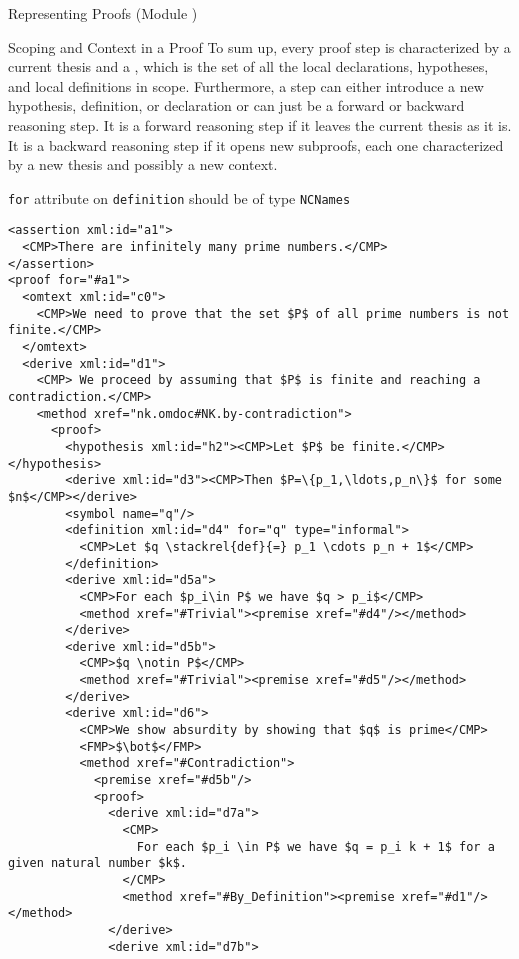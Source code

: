 \begin{tchapter}[id=proofs,short=Representing Proofs]{Representing Proofs (Module {})}
\begin{tsection}[id=proofs:scoping]{Scoping and Context in a Proof}
  To sum up, every proof step is characterized by a current thesis and a
  {}, which is the set of all the local declarations, hypotheses,
  and local definitions in scope. Furthermore, a step can either introduce a new
  hypothesis, definition, or declaration or can just be a forward or backward
  reasoning step.  It is a forward reasoning {} step if it leaves the current
  thesis as it is.  It is a backward reasoning {} step if it opens new
  subproofs, each one characterized by a new thesis and possibly a new context.

\begin{erratum}[reported-by=Michael Kohlhase,date=2009-08-11]{{\texttt{for}} attribute on
    {\texttt{definition}} should be of type {\texttt{NCNames}}}
\begin{lstlisting}[label=lst:primes-omdoc,mathescape,
  caption={A top-down Representation of the Proof in {\myfigref{pf-example1-math}}.},
  index={symbol,definition}]
<assertion xml:id="a1">
  <CMP>There are infinitely many prime numbers.</CMP>
</assertion>
<proof for="#a1">
  <omtext xml:id="c0">
    <CMP>We need to prove that the set $P$ of all prime numbers is not finite.</CMP>
  </omtext>
  <derive xml:id="d1">
    <CMP> We proceed by assuming that $P$ is finite and reaching a contradiction.</CMP>
    <method xref="nk.omdoc#NK.by-contradiction">
      <proof>
        <hypothesis xml:id="h2"><CMP>Let $P$ be finite.</CMP></hypothesis>
        <derive xml:id="d3"><CMP>Then $P=\{p_1,\ldots,p_n\}$ for some $n$</CMP></derive>
        <symbol name="q"/>
        <definition xml:id="d4" for="q" type="informal">
          <CMP>Let $q \stackrel{def}{=} p_1 \cdots p_n + 1$</CMP>
        </definition>
        <derive xml:id="d5a">
          <CMP>For each $p_i\in P$ we have $q > p_i$</CMP>
          <method xref="#Trivial"><premise xref="#d4"/></method>
        </derive>
        <derive xml:id="d5b">
          <CMP>$q \notin P$</CMP>
          <method xref="#Trivial"><premise xref="#d5"/></method>
        </derive>
        <derive xml:id="d6">
          <CMP>We show absurdity by showing that $q$ is prime</CMP>
          <FMP>$\bot$</FMP>
          <method xref="#Contradiction">
            <premise xref="#d5b"/>
            <proof>
              <derive xml:id="d7a">
                <CMP>
                  For each $p_i \in P$ we have $q = p_i k + 1$ for a given natural number $k$.
                </CMP>
                <method xref="#By_Definition"><premise xref="#d1"/></method>
              </derive>
              <derive xml:id="d7b">

\end{lstlisting}
\end{erratum}
\end{tsection}
\end{tchapter}
